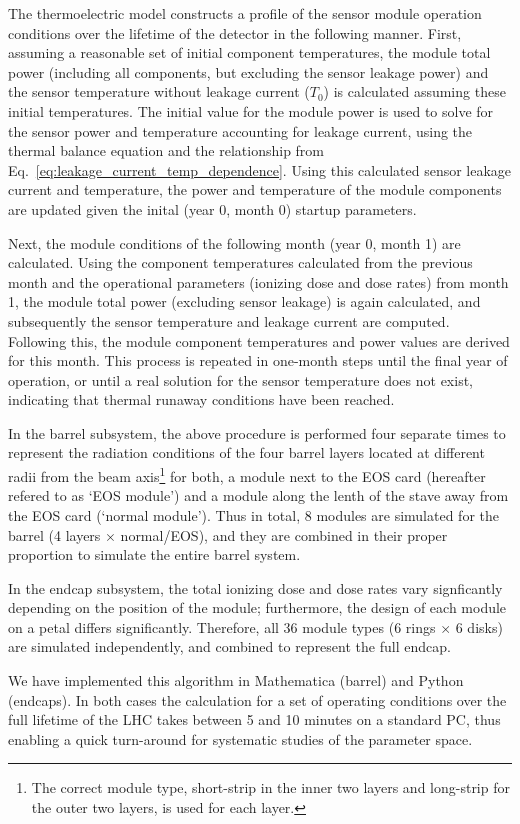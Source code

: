 \label{sec:running}
The thermoelectric model constructs a profile of the sensor module operation conditions over the
lifetime of the detector in the following manner. First, assuming a reasonable set of initial
component temperatures, the module total power (including all components, but excluding the sensor
leakage power) and the sensor temperature without leakage current ($T_0$) is calculated assuming these
initial temperatures.
The initial value for the module power is used to solve for the sensor power and temperature accounting
for leakage current, using the thermal balance equation and the relationship from
Eq.~\ref{eq:leakage_current_temp_dependence}.
Using this calculated sensor leakage current and temperature, the power and temperature of the module
components are updated given the inital (year 0, month 0) startup parameters.

Next, the module conditions of the following month (year 0, month 1) are calculated. Using the component
temperatures calculated from the previous month and the operational parameters (ionizing dose and dose
rates) from month 1, the module total power (excluding sensor leakage) is again calculated, and
subsequently the sensor temperature and leakage current are computed. Following this,
the module component temperatures and power values are derived for this month. This process is repeated in one-month
steps until the final year of operation, or until a real solution for the sensor temperature does not
exist, indicating that thermal runaway conditions have been reached.

In the barrel subsystem, the above procedure is performed four separate times to
represent the radiation conditions of the four barrel layers located at different radii from the beam axis\footnote{The correct module type, short-strip in the inner two layers and long-strip for the outer two layers, is used for each layer.} for both, a module next to the EOS card (hereafter refered to as `EOS module') and a module along the lenth of the stave away from the EOS card (`normal module'). Thus in total, 8 modules are simulated for the barrel (4 layers $\times$ normal/EOS), and they are combined in their proper proportion to simulate the entire barrel system.

In the endcap subsystem, the total ionizing dose and dose rates vary signficantly depending on the
position of the module; furthermore, the design of each module on a petal differs significantly.
Therefore, all 36 module types (6 rings $\times$ 6 disks) are simulated independently, and combined to
represent the full endcap.

We have implemented this algorithm in Mathematica (barrel) and Python (endcaps). In both cases the calculation for a set of operating conditions over the full lifetime of the LHC takes between 5 and 10 minutes on a standard PC, thus enabling a quick turn-around for systematic studies of the parameter space.

